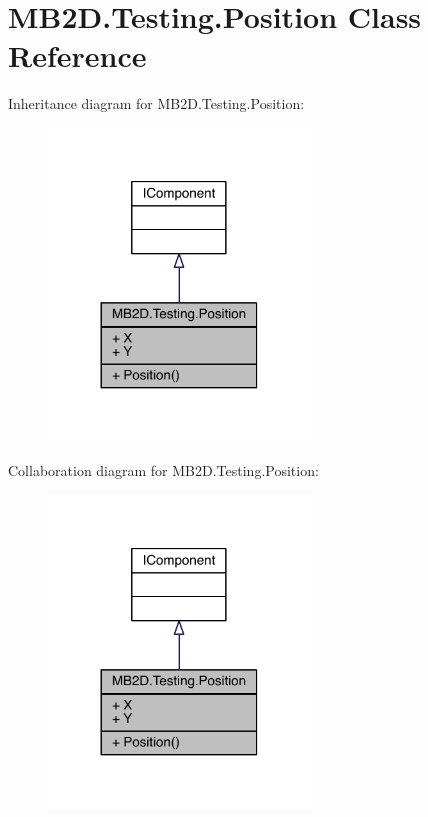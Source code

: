 \hypertarget{class_m_b2_d_1_1_testing_1_1_position}{}\section{M\+B2\+D.\+Testing.\+Position Class Reference}
\label{class_m_b2_d_1_1_testing_1_1_position}


Inheritance diagram for M\+B2\+D.\+Testing.\+Position\+:
\nopagebreak
\begin{figure}[H]
\begin{center}
\leavevmode
\includegraphics[width=197pt]{class_m_b2_d_1_1_testing_1_1_position__inherit__graph}
\end{center}
\end{figure}


Collaboration diagram for M\+B2\+D.\+Testing.\+Position\+:
\nopagebreak
\begin{figure}[H]
\begin{center}
\leavevmode
\includegraphics[width=197pt]{class_m_b2_d_1_1_testing_1_1_position__coll__graph}
\end{center}
\end{figure}
